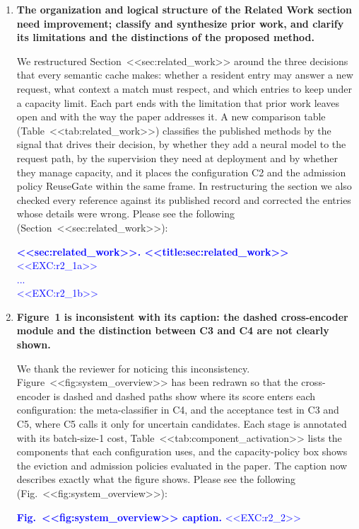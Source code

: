 \documentclass[11pt]{article}
\begin{document}
\begin{enumerate}[leftmargin=*, itemsep=1.2em]

\item \textbf{The organization and logical structure of the Related Work section need improvement; classify and synthesize prior work, and clarify its limitations and the distinctions of the proposed method.}

We restructured Section~<<sec:related_work>> around the three decisions that every semantic cache makes: whether a resident entry may answer a new request, what context a match must respect, and which entries to keep under a capacity limit. Each part ends with the limitation that prior work leaves open and with the way the paper addresses it. A new comparison table (Table~<<tab:related_work>>) classifies the published methods by the signal that drives their decision, by whether they add a neural model to the request path, by the supervision they need at deployment and by whether they manage capacity, and it places the configuration C2 and the admission policy ReuseGate within the same frame. In restructuring the section we also checked every reference against its published record and corrected the entries whose details were wrong. Please see the following (Section~<<sec:related_work>>):

\textcolor{blue}{\textbf{<<sec:related_work>>. <<title:sec:related_work>>}\\
<<EXC:r2_1a>>\\
...\\
<<EXC:r2_1b>>}

\item \textbf{Figure~1 is inconsistent with its caption: the dashed cross-encoder module and the distinction between C3 and C4 are not clearly shown.}

We thank the reviewer for noticing this inconsistency. Figure~<<fig:system_overview>> has been redrawn so that the cross-encoder is dashed and dashed paths show where its score enters each configuration: the meta-classifier in C4, and the acceptance test in C3 and C5, where C5 calls it only for uncertain candidates. Each stage is annotated with its batch-size-1 cost, Table~<<tab:component_activation>> lists the components that each configuration uses, and the capacity-policy box shows the eviction and admission policies evaluated in the paper. The caption now describes exactly what the figure shows. Please see the following (Fig.~<<fig:system_overview>>):

\textcolor{blue}{\textbf{Fig.~<<fig:system_overview>> caption.} <<EXC:r2_2>>}


\end{enumerate}
\end{document}
